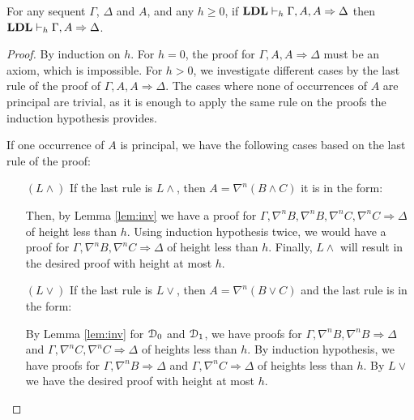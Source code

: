 \begin{thm}\label{thm:lc-adm} For any sequent $\Gamma$, $\Delta$ and $A$, and any $h \geq 0$, if $\mathbf{LDL} \vdash_h \Gamma, A, A \Rightarrow \Delta$ then $\mathbf{LDL} \vdash_h \Gamma, A \Rightarrow \Delta$.
\end{thm}
\begin{proof}
  By induction on $h$. For $h = 0$, the proof for $\Gamma, A, A \Rightarrow \Delta$ must be an axiom, which is impossible. For $h > 0$, we investigate different cases by the last rule of the proof of $\Gamma, A, A \Rightarrow \Delta$. The cases where none of occurrences of $A$ are principal are trivial, as it is enough to apply the same rule on the proofs the induction hypothesis provides.
  
  If one occurrence of $A$ is principal, we have the following cases based on the last rule of the proof:
	\begin{itemize}
		\item[$(L \wedge)$] If the last rule is $L \wedge$, then $A = \nabla^n (B \wedge C)$ it is in the form:

		\begin{prooftree}
			 \noLine
		\end{prooftree}

		Then, by Lemma \ref{lem:inv} we have a proof for $\Gamma, \nabla^n B, \nabla^n B, \nabla^n C, \nabla^n C \Rightarrow \Delta$ of height less than $h$. Using induction hypothesis twice, we would have a proof for $\Gamma, \nabla^n B, \nabla^n C \Rightarrow \Delta$ of height less than $h$. Finally, $L \wedge$ will result in the desired proof with height at most $h$.
	
		\item[$(L \vee)$] If the last rule is $L \vee$, then $A = \nabla^n (B \vee C)$ and the last rule is in the form:
		\begin{prooftree}
			 \noLine
			\UIC{$ \Gamma, \nabla^n B, \nabla^n (B \vee C) \Rightarrow \Delta$}
			 \noLine
			\UIC{$\Gamma, \nabla^n C, \nabla^n (B \vee C) \Rightarrow \Delta$}
			\RightLabel{$L \vee$}
			\BIC{$ \Gamma, \nabla^n (B \vee C), \nabla^n (B \vee C) \Rightarrow \Delta$}		
		\end{prooftree}
		By Lemma \ref{lem:inv} for $\mathcal{D}_0$ and $\mathcal{D}_1$, we have proofs for $\Gamma, \nabla^n B, \nabla^n B \Rightarrow \Delta$ and $\Gamma, \nabla^n C, \nabla^n C \Rightarrow \Delta$ of heights less than $h$. By induction hypothesis, we have proofs for $\Gamma, \nabla^n B \Rightarrow \Delta$ and $\Gamma, \nabla^n C \Rightarrow \Delta$ of heights less than $h$. By $L \vee$ we have the desired proof with height at most $h$.
	

\end{itemize}
\end{proof}
